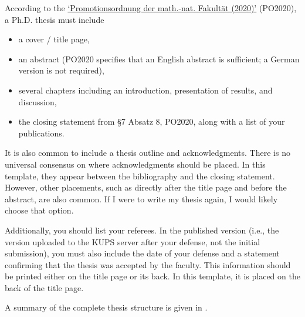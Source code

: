 According to the \href{https://mathnat.uni-koeln.de/sites/dekanat/official/Ordnungen/Promotionsordnung_2020.pdf}{`Promotionsordnung der math.-nat. Fakultät (2020)'} (PO2020), a Ph.D. thesis must include
\begin{itemize}
	\item a cover / title page,
	\item an abstract (PO2020 specifies that an English abstract is sufficient; a German version is not required),
	\item several chapters including an introduction, presentation of results, and discussion,
	\item the closing statement from §7 Absatz 8, PO2020, along with a list of your publications.
\end{itemize}
It is also common to include a thesis outline and acknowledgments. There is no universal consensus on where acknowledgments should be placed. In this template, they appear between the bibliography and the closing statement. However, other placements, such as directly after the title page and before the abstract, are also common. If I were to write my thesis again, I would likely choose that option.

Additionally, you should list your referees. In the published version (i.e., the version uploaded to the KUPS server after your defense, not the initial submission), you must also include the date of your defense and a statement confirming that the thesis was accepted by the faculty. This information should be printed either on the title page or its back. In this template, it is placed on the back of the title page.

A summary of the complete thesis structure is given in .

